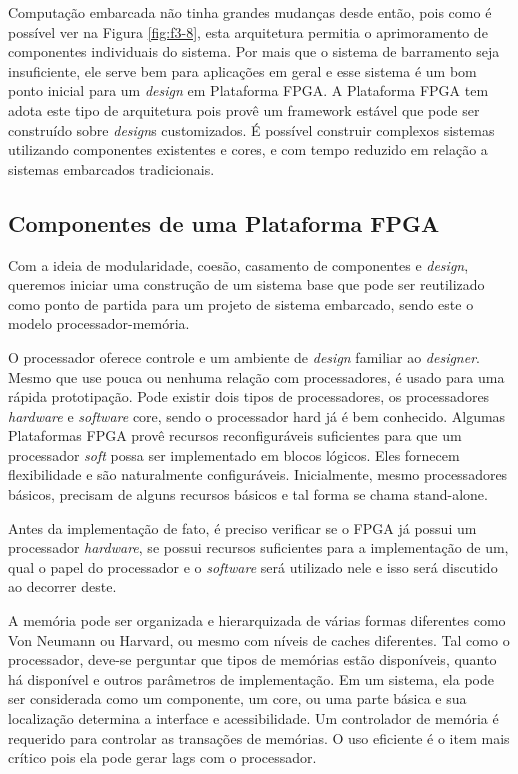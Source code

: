 Computação embarcada não tinha grandes mudanças desde então, pois como é possível ver na Figura \ref{fig:f3-8}, esta arquitetura permitia o aprimoramento de componentes individuais do sistema. Por mais que o sistema de barramento seja insuficiente, ele serve bem para aplicações em geral e esse sistema é um bom ponto inicial para um \textit{design} em Plataforma FPGA. A Plataforma FPGA tem adota este tipo de arquitetura pois provê um framework estável que pode ser construído sobre \textit{design}s customizados. É possível construir complexos sistemas utilizando componentes existentes e cores, e com tempo reduzido em relação a sistemas embarcados tradicionais.


\subsection{Componentes de uma Plataforma FPGA}

Com a ideia de modularidade, coesão, casamento de componentes e \textit{design}, queremos iniciar uma construção de um sistema base que pode ser reutilizado como ponto de partida para um projeto de sistema embarcado, sendo este o modelo processador-memória.

O processador oferece controle e um ambiente de \textit{design} familiar ao \textit{\textit{design}er}. Mesmo que use pouca ou nenhuma relação com processadores, é usado para uma rápida prototipação. Pode existir dois tipos de processadores, os processadores \textit{hardware} e \textit{software} core, sendo o processador hard já é bem conhecido. Algumas Plataformas FPGA provê recursos reconfiguráveis suficientes para que um processador \textit{soft} possa ser implementado em blocos lógicos. Eles fornecem flexibilidade e são naturalmente configuráveis. Inicialmente, mesmo processadores básicos, precisam de alguns recursos básicos e tal forma se chama stand-alone.

Antes da implementação de fato, é preciso verificar se o FPGA já possui um processador \textit{hardware}, se possui recursos suficientes para a implementação de um, qual o papel do processador e o \textit{software} será utilizado nele e isso será discutido ao decorrer deste.

A memória pode ser organizada e hierarquizada de várias formas diferentes como Von Neumann ou Harvard, ou mesmo com níveis de caches diferentes. Tal como o processador, deve-se perguntar que tipos de memórias estão disponíveis, quanto há disponível e outros parâmetros de implementação. Em um sistema, ela pode ser considerada como um componente, um core, ou uma parte básica e sua localização determina a interface e acessibilidade. Um controlador de memória é requerido para controlar as transações de memórias. O uso eficiente é o item mais crítico pois ela pode gerar lags com o processador.

